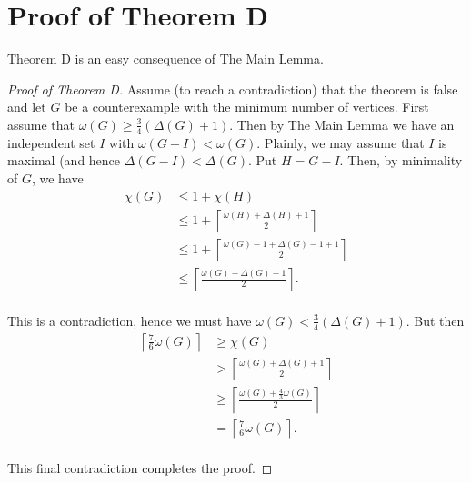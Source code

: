 \documentclass[12pt]{article}
\theoremstyle{plain}
\theoremstyle{definition}
\theoremstyle{remark}
\begin{document}
\section{Proof of Theorem D}
Theorem D is an easy consequence of The Main Lemma.
\begin{proof}[Proof of Theorem D]
Assume (to reach a contradiction) that the theorem is false and let $G$ be a counterexample with the minimum number of vertices.  First assume that $\omega(G) \geq \frac{3}{4}(\Delta(G) + 1)$.  Then by The Main Lemma we have an independent set $I$ with $\omega(G - I) < \omega(G)$.  Plainly, we may assume that $I$ is maximal (and hence $\Delta(G - I) < \Delta(G)$. Put $H = G - I$.  Then, by minimality of $G$, we have
\begin{align*}
\chi(G) &\leq 1 + \chi(H) \\
&\leq 1 + \left\lceil \frac{\omega(H) + \Delta(H) + 1}{2}\right\rceil \\
&\leq 1 + \left\lceil \frac{\omega(G) - 1 + \Delta(G) - 1 + 1}{2}\right\rceil \\
&\leq \left\lceil \frac{\omega(G) + \Delta(G) + 1}{2}\right\rceil. \\
\end{align*}

This is a contradiction, hence we must have $\omega(G) < \frac{3}{4}(\Delta(G) + 1)$.  But then
\begin{align*}
\left\lceil \frac{7}{6}\omega(G) \right\rceil &\geq \chi(G) \\
&> \left\lceil \frac{\omega(G) + \Delta(G) + 1}{2}\right\rceil \\
&\geq \left\lceil \frac{\omega(G) + \frac{4}{3}\omega(G)}{2}\right\rceil \\
&= \left\lceil \frac{7}{6}\omega(G) \right\rceil. \\
\end{align*}

This final contradiction completes the proof.
\end{proof}
\end{document}
